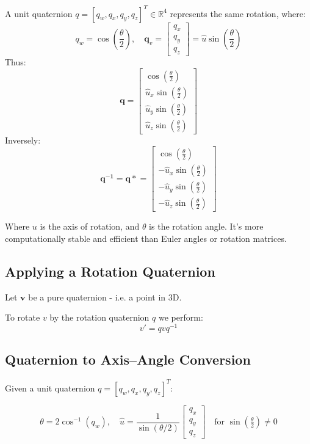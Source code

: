 \documentclass[11pt,a4paper]{article}
\begin{document}
A unit quaternion \( q = [q_w, q_x, q_y, q_z]^T \in \mathbb{R}^4 \) represents the same rotation, where:
\[
q_w = \cos\left(\frac{\theta}{2}\right), \quad
\mathbf{q}_v =
\begin{bmatrix}
q_x \\ q_y \\ q_z
\end{bmatrix}
= \hat{u} \sin\left(\frac{\theta}{2}\right)
\]
Thus:
\[
\mathbf{q} =
\begin{bmatrix}
\cos\left(\frac{\theta}{2}\right) \\
\hat{u}_x \sin\left(\frac{\theta}{2}\right) \\
\hat{u}_y \sin\left(\frac{\theta}{2}\right) \\
\hat{u}_z \sin\left(\frac{\theta}{2}\right)
\end{bmatrix}
\]
Inversely:
\[
\mathbf{q^{-1}} = \mathbf{q*} =
\begin{bmatrix}
\cos\left(\frac{\theta}{2}\right) \\
- \hat{u}_x \sin\left(\frac{\theta}{2}\right) \\
- \hat{u}_y \sin\left(\frac{\theta}{2}\right) \\
- \hat{u}_z \sin\left(\frac{\theta}{2}\right)
\end{bmatrix}
\]

Where \( u \) is the axis of rotation, and \( \theta \) is the rotation angle. It's more computationally stable and efficient than Euler angles or rotation matrices.

\subsection*{Applying a Rotation Quaternion}

Let \( \mathbf{v} \) be a pure quaternion - i.e. a point in 3D.

To rotate \( v \) by the rotation quaternion \( q \) we perform:
\[
v' = q v q^{-1}
\]

\subsection*{Quaternion to Axis--Angle Conversion}

Given a unit quaternion \( q = [q_w, q_x, q_y, q_z]^T \):

\[
\theta = 2 \cos^{-1}(q_w), \quad
\hat{u} =
\frac{1}{\sin(\theta/2)}
\begin{bmatrix}
q_x \\ q_y \\ q_z
\end{bmatrix}
\quad \text{for } \sin(\tfrac{\theta}{2}) \neq 0
\]
\end{document}
